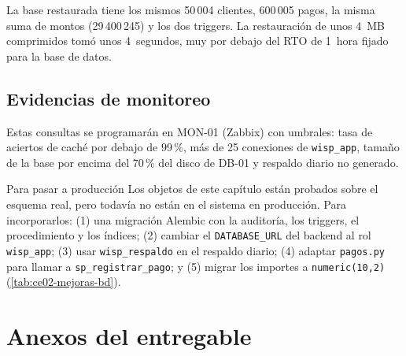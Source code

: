 

\noindent La base restaurada tiene los mismos 50\,004 clientes, 600\,005 pagos, la misma
suma de montos (29\,400\,245) y los dos triggers. La restauración de unos 4~MB comprimidos
tomó unos 4~segundos, muy por debajo del RTO de 1~hora fijado para la base de datos.

\subsection{Evidencias de monitoreo}





\noindent Estas consultas se programarán en MON-01 (Zabbix) con umbrales: tasa de
aciertos de caché por debajo de 99\,\%, más de 25 conexiones de \texttt{wisp\_app}, tamaño
de la base por encima del 70\,\% del disco de DB-01 y respaldo diario no generado.

\begin{upeubox}{Para pasar a producción}
Los objetos de este capítulo están probados sobre el esquema real, pero todavía no
están en el sistema en producción. Para incorporarlos: (1) una migración Alembic con la
auditoría, los triggers, el procedimiento y los índices; (2) cambiar el
\texttt{DATABASE\_URL} del backend al rol \texttt{wisp\_app}; (3) usar
\texttt{wisp\_respaldo} en el respaldo diario; (4) adaptar \texttt{pagos.py} para llamar a
\texttt{sp\_registrar\_pago}; y (5) migrar los importes a \texttt{numeric(10,2)}
(\cref{tab:ce02-mejoras-bd}).
\end{upeubox}

\section{Anexos del entregable}
\label{sec:ce02-e2-anexos}

